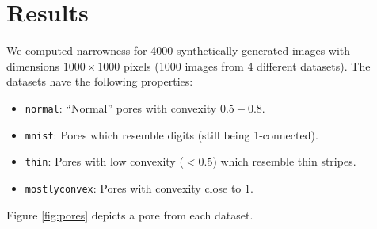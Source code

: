 \documentclass[reprint,amsmath,amssymb,aps,pre,showkeys,showpacs]{revtex4-1}
\begin{document}
\section{Results}
We computed narrowness for 4000 synthetically generated images with dimensions
$1000 \times 1000$ pixels (1000 images from 4 different datasets). The datasets
have the following properties:
\begin{itemize}
\item \texttt{normal}: ``Normal'' pores with convexity $0.5-0.8$.
\item \texttt{mnist}: Pores which resemble digits (still being 1-connected).
\item \texttt{thin}: Pores with low convexity ($< 0.5$) which resemble thin
  stripes.
\item \texttt{mostlyconvex}: Pores with convexity close to $1$.
\end{itemize}
Figure \ref{fig:pores} depicts a pore from each dataset.
\end{document}
